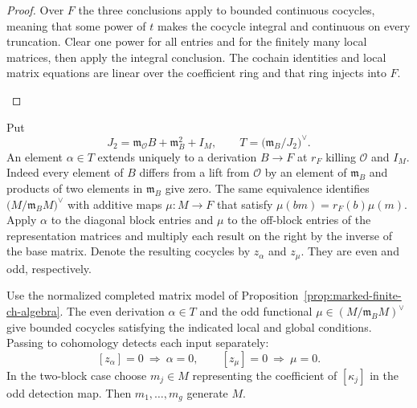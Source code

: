 \begin{proof}
Over \(F\) the three conclusions apply to bounded
continuous cocycles, meaning that some power of
\(t\) makes the cocycle integral and continuous on
every truncation. Clear one power for all entries
and for the finitely many local matrices, then
apply the integral conclusion. The cochain identities and local matrix equations are linear over the
coefficient ring and that ring injects into \(F\).

\label{cor:ordinary-patching-cotangent-4}

\end{proof}

Put
\[
       J_2=\mathfrak m_{\mathcal O}B+\mathfrak m_B^2+I_M,
       \qquad T=\bigl(\mathfrak m_B/J_2\bigr)^\vee .
\]
An element \(\alpha\in T\) extends uniquely to a derivation
\(B\to F\) at \(r_F\) killing \(\mathcal O\) and \(I_M\).
Indeed every element of \(B\) differs from a lift from
\(\mathcal O\) by an element of \(\mathfrak m_B\) and
products of two elements in \(\mathfrak m_B\) give zero.
The same equivalence identifies
\(\bigl(M/\mathfrak m_B M\bigr)^\vee\)
with additive maps \(\mu:M\to F\) that satisfy
\(\mu(bm)=r_F(b)\mu(m)\).
Apply \(\alpha\) to the diagonal block entries and
\(\mu\) to the off-block entries of the representation
matrices and multiply each result on the right by
the inverse of the base matrix. Denote the resulting
cocycles by \(z_\alpha\) and \(z_\mu\).
They are even and odd, respectively.

\begin{proposition}\label{prop:marked-cotangent-detection}
Use the normalized completed matrix model of
Proposition~\ref{prop:marked-finite-ch-algebra}. The even
derivation \(\alpha\in T\) and the odd functional
\(\mu\in(M/\mathfrak m_BM)^\vee\) give bounded cocycles satisfying
the indicated local and global conditions. Passing to cohomology detects each input separately: 
\[
 [z_\alpha]=0\ \Longrightarrow\ \alpha=0,\qquad [z_\mu]=0\ \Longrightarrow\ \mu=0.
\]
 In the two-block case choose
\(m_j\in M\) representing the coefficient of \([\kappa_j]\)
in the odd detection map. Then \(m_1,\ldots,m_g\) generate \(M\).
\end{proposition}

